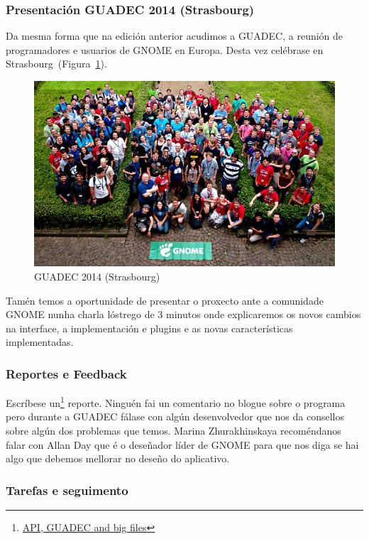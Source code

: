 \subsubsection{Presentación GUADEC 2014 (Strasbourg)}
Da mesma forma que na edición anterior acudimos a GUADEC, a reunión de programadores e usuarios de GNOME en Europa. Desta vez celébrase en Strasbourg~(Figura~\ref{fig:guadec2014}).

\begin{figure}[h!]
    \centering
    \includegraphics[width=0.999\textwidth]{img/guadec_2014.jpg}
    \caption{GUADEC 2014 (Strasbourg)}
    \label{fig:guadec2014}
\end{figure}

Tamén temos a oportunidade de presentar o proxecto ante a comunidade GNOME nunha charla lóstrego de 3 minutos onde explicaremos os novos cambios na interface, a implementación e plugins e as novas características implementadas.

\subsubsection{Reportes e Feedback}

Escríbese un\footnote{\href{http://aquelando.info/api-guadec-and-big-files/}{API, GUADEC and big files}} reporte. Ninguén fai un comentario no blogue sobre o programa pero durante a GUADEC fálase con algún desenvolvedor que nos da consellos sobre algún dos problemas que temos. Marina Zhurakhinskaya recoméndanos falar con Allan Day que é o deseñador líder de GNOME para que nos diga se hai algo que debemos mellorar no deseño do aplicativo.

\subsubsection{Tarefas e seguimento}

